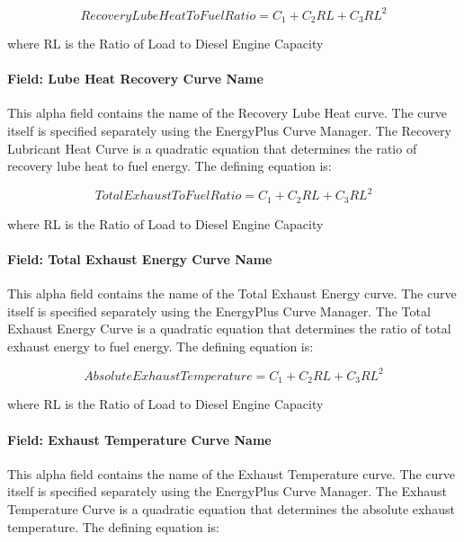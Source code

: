 \begin{equation}
RecoveryLubeHeatToFuelRatio = {C_1} + {C_2}RL + {C_3}R{L^2}
\end{equation}

where RL is the Ratio of Load to Diesel Engine Capacity

\paragraph{Field: Lube Heat Recovery Curve Name}\label{field-lube-heat-recovery-curve-name-000}

This alpha field contains the name of the Recovery Lube Heat curve. The curve itself is specified separately using the EnergyPlus Curve Manager. The Recovery Lubricant Heat Curve is a quadratic equation that determines the ratio of recovery lube heat to fuel energy. The defining equation is:

\begin{equation}
TotalExhaustToFuelRatio = {C_1} + {C_2}RL + {C_3}R{L^2}
\end{equation}

where RL is the Ratio of Load to Diesel Engine Capacity

\paragraph{Field: Total Exhaust Energy Curve Name}\label{field-total-exhaust-energy-curve-name-000}

This alpha field contains the name of the Total Exhaust Energy curve. The curve itself is specified separately using the EnergyPlus Curve Manager. The Total Exhaust Energy Curve is a quadratic equation that determines the ratio of total exhaust energy to fuel energy. The defining equation is:

\begin{equation}
AbsoluteExhaustTemperature = {C_1} + {C_2}RL + {C_3}R{L^2}
\end{equation}

where RL is the Ratio of Load to Diesel Engine Capacity

\paragraph{Field: Exhaust Temperature Curve Name}\label{field-exhaust-temperature-curve-name-000}

This alpha field contains the name of the Exhaust Temperature curve. The curve itself is specified separately using the EnergyPlus Curve Manager. The Exhaust Temperature Curve is a quadratic equation that determines the absolute exhaust temperature. The defining equation is:

